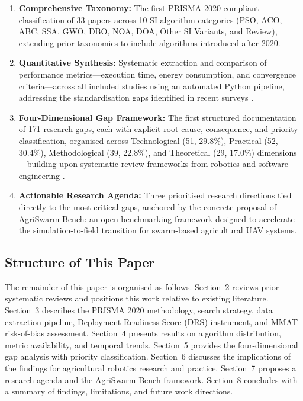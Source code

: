 \documentclass[review,3p,times]{elsarticle}
\begin{document}
\begin{enumerate}
    \item \textbf{Comprehensive Taxonomy:} The first PRISMA 2020-compliant classification of 33 papers across 10 SI algorithm categories (PSO, ACO, ABC, SSA, GWO, DBO, NOA, DOA, Other SI Variants, and Review), extending prior taxonomies \cite{chung2018,brambilla2013,puente2022,sharma2022} to include algorithms introduced after 2020.
    \item \textbf{Quantitative Synthesis:} Systematic extraction and comparison of performance metrics---execution time, energy consumption, and convergence criteria---across all included studies using an automated Python pipeline, addressing the standardisation gaps identified in recent surveys \cite{phung2021,pan2022,aitsaadi2022}.
    \item \textbf{Four-Dimensional Gap Framework:} The first structured documentation of 171 research gaps, each with explicit root cause, consequence, and priority classification, organised across Technological (51, 29.8\%), Practical (52, 30.4\%), Methodological (39, 22.8\%), and Theoretical (29, 17.0\%) dimensions---building upon systematic review frameworks from robotics and software engineering \cite{brambilla2013,bayindir2016}.
    \item \textbf{Actionable Research Agenda:} Three prioritised research directions tied directly to the most critical gaps, anchored by the concrete proposal of AgriSwarm-Bench: an open benchmarking framework designed to accelerate the simulation-to-field transition for swarm-based agricultural UAV systems.
\end{enumerate}

\subsection{Structure of This Paper}

The remainder of this paper is organised as follows. Section~2 reviews prior systematic reviews and positions this work relative to existing literature. Section~3 describes the PRISMA 2020 methodology, search strategy, data extraction pipeline, Deployment Readiness Score (DRS) instrument, and MMAT risk-of-bias assessment. Section~4 presents results on algorithm distribution, metric availability, and temporal trends. Section~5 provides the four-dimensional gap analysis with priority classification. Section~6 discusses the implications of the findings for agricultural robotics research and practice. Section~7 proposes a research agenda and the AgriSwarm-Bench framework. Section~8 concludes with a summary of findings, limitations, and future work directions.
\end{document}
